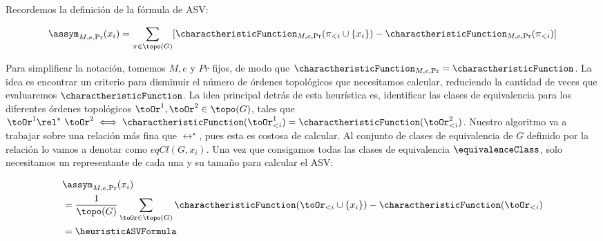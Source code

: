 \begin{comment}
Heuristica para ASV
    Introducción
    Cantidad de órdenes topológicos de un DAG
        Queremos topoSorts(polyTree) pues nuestra red es un polytree.
        Cantidad de ordenes topológicos para un “árbol”.
        Cantidad de clases de equivalencia para un “árbol”
\end{comment}


Recordemos la definición de la fórmula de ASV:

\begin{align*}
    \assym_{M,e,\Pr}(x_i) = \sum_{\pi \in \topo(G)} [\charactheristicFunction_{M,e,\Pr}(\pi_{<i} \cup \{x_i\}) - \charactheristicFunction_{M,e,\Pr}(\pi_{<i})] 
\end{align*}

Para simplificar la notación, tomemos $M,e$ y $Pr$ fijos, de modo que $\charactheristicFunction_{M,e,\Pr} = \charactheristicFunction$. La idea es encontrar un criterio para disminuir el número de órdenes topológicos que necesitamos calcular, reduciendo la cantidad de veces que evaluaremos $\charactheristicFunction$. La idea principal detrás de esta heurística es, identificar las clases de equivalencia para los diferentes órdenes topológicos $\toOr^1, \toOr^2 \in \topo(G)$, tales que $\toOr^1 \rel^\star \ \toOr^2 \iff \charactheristicFunction(\toOr^1_{<i}) = \charactheristicFunction(\toOr^2_{<i}) $. Nuestro algoritmo va a trabajar sobre una relación \rel{} más fina que $\rel^\star$, pues esta es costosa de calcular. Al conjunto de clases de equivalencia de $G$ definido por la relación \rel{} lo vamos a denotar como $eqCl(G, x_i)$. Una vez que consigamos todas las clases de equivalencia $\equivalenceClass$, solo necesitamos un representante de cada una y su tamaño para calcular el ASV:

\begin{align*}
        &\assym_{M,e,\Pr}(x_i)\\
        &= \frac{1}{\topo(G)} \sum_{\toOr \in \topo(G)} \charactheristicFunction(\toOr_{<i} \cup \{x_i\}) - \charactheristicFunction(\toOr_{<i}) \\
        &=  \heuristicASVFormula
    \end{align*}



